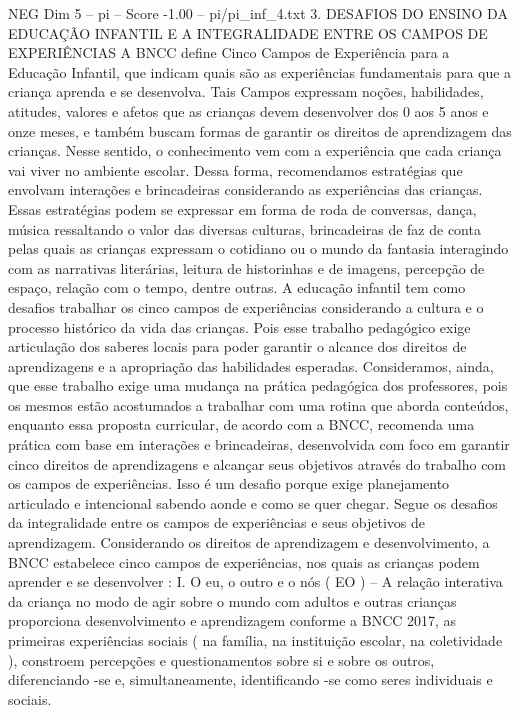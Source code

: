 \begin{textsample}{NEG Dim 5 – pi – Score -1.00 – pi/pi\_inf\_4.txt}  \label{ex:f5_neg_056}
3.
DESAFIOS DO ENSINO DA EDUCAÇÃO INFANTIL E A INTEGRALIDADE ENTRE OS CAMPOS DE EXPERIÊNCIAS A BNCC define Cinco Campos de Experiência para a Educação Infantil, que indicam quais são as experiências fundamentais para que a criança aprenda e se desenvolva.
Tais Campos expressam noções, habilidades, atitudes, valores e afetos que as crianças devem desenvolver dos 0 aos 5 anos e onze meses, e também buscam formas de garantir os direitos de aprendizagem das crianças.
Nesse sentido, o conhecimento vem com a experiência que cada criança vai viver no ambiente escolar.
Dessa forma, recomendamos estratégias que envolvam interações e brincadeiras considerando as experiências das crianças.
Essas estratégias podem se expressar em forma de roda de conversas, dança, música ressaltando o valor das diversas culturas, brincadeiras de faz de conta pelas quais as crianças expressam o cotidiano ou o mundo da fantasia interagindo com as narrativas literárias, leitura de historinhas e de imagens, percepção de espaço, relação com o tempo, dentre outras.
A educação infantil tem como desafios trabalhar os cinco campos de experiências considerando a cultura e o processo histórico da vida das crianças.
Pois esse trabalho pedagógico exige articulação dos saberes locais para poder garantir o alcance dos direitos de aprendizagens e a apropriação das habilidades esperadas.
Consideramos, ainda, que esse trabalho exige uma mudança na prática pedagógica dos professores, pois os mesmos estão acostumados a trabalhar com uma rotina que aborda conteúdos, enquanto essa proposta curricular, de acordo com a BNCC, recomenda uma prática com base em interações e brincadeiras, desenvolvida com foco em garantir cinco direitos de aprendizagens e alcançar seus objetivos através do trabalho com os campos de experiências.
Isso é um desafio porque exige planejamento articulado e intencional sabendo aonde e como se quer chegar.
Segue os desafios da integralidade entre os campos de experiências e seus objetivos de aprendizagem.
Considerando os direitos de aprendizagem e desenvolvimento, a BNCC estabelece cinco campos de experiências, nos quais as crianças podem aprender e se desenvolver : I.
O eu, o outro e o nós ( EO ) – A relação interativa da criança no modo de agir sobre o mundo com adultos e outras crianças proporciona desenvolvimento e aprendizagem conforme a BNCC 2017, as primeiras experiências sociais ( na família, na instituição escolar, na coletividade ), constroem percepções e questionamentos sobre si e sobre os outros, diferenciando -se e, simultaneamente, identificando -se como seres individuais e sociais.

\end{textsample}
